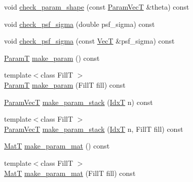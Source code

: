 \begin{DoxyCompactItemize}
\item 
void \hyperlink{classmappel_1_1PointEmitterModel_a54b341a9bc0e32e2c8bbfe4ec0d8c9a1}{check\+\_\+param\+\_\+shape} (const \hyperlink{classmappel_1_1PointEmitterModel_add253b568d763f1513a810aac35de719}{Param\+VecT} \&theta) const 
\item 
void \hyperlink{classmappel_1_1PointEmitterModel_a01ce8d6358acbd2575be519dff1df89b}{check\+\_\+psf\+\_\+sigma} (double psf\+\_\+sigma) const 
\item 
void \hyperlink{classmappel_1_1PointEmitterModel_a85780ca544a5ef5e0a62e74005081677}{check\+\_\+psf\+\_\+sigma} (const \hyperlink{namespacemappel_a2225ad69f358daa3f4f99282a35b9a3a}{VecT} \&psf\+\_\+sigma) const 
\item 
\hyperlink{classmappel_1_1PointEmitterModel_a665ec6aea3aac139bb69a23c06d4b9a1}{ParamT} \hyperlink{classmappel_1_1PointEmitterModel_a1cd8ff64ce4132b6eaa8655696885749}{make\+\_\+param} () const 
\item 
{\footnotesize template$<$class FillT $>$ }\\\hyperlink{classmappel_1_1PointEmitterModel_a665ec6aea3aac139bb69a23c06d4b9a1}{ParamT} \hyperlink{classmappel_1_1PointEmitterModel_a5638e3df26cf84d7cf0f23112132682e}{make\+\_\+param} (FillT fill) const 
\item 
\hyperlink{classmappel_1_1PointEmitterModel_add253b568d763f1513a810aac35de719}{Param\+VecT} \hyperlink{classmappel_1_1PointEmitterModel_a6c7edc7f2549058df66472cd7647cf9b}{make\+\_\+param\+\_\+stack} (\hyperlink{namespacemappel_ab17ec0f30b61ece292439d7ece81d3a8}{IdxT} n) const 
\item 
{\footnotesize template$<$class FillT $>$ }\\\hyperlink{classmappel_1_1PointEmitterModel_add253b568d763f1513a810aac35de719}{Param\+VecT} \hyperlink{classmappel_1_1PointEmitterModel_abab975b04e09e6336a930b6d8fd8c267}{make\+\_\+param\+\_\+stack} (\hyperlink{namespacemappel_ab17ec0f30b61ece292439d7ece81d3a8}{IdxT} n, FillT fill) const 
\item 
\hyperlink{namespacemappel_a7091ab87c528041f7e2027195fad8915}{MatT} \hyperlink{classmappel_1_1PointEmitterModel_a8ede9fe8e3b6a3e621c2da72e23c7f9d}{make\+\_\+param\+\_\+mat} () const 
\item 
{\footnotesize template$<$class FillT $>$ }\\\hyperlink{namespacemappel_a7091ab87c528041f7e2027195fad8915}{MatT} \hyperlink{classmappel_1_1PointEmitterModel_a68a9c537f2f2725eb8fb9d3e250dd84b}{make\+\_\+param\+\_\+mat} (FillT fill) const 
\item 

\end{DoxyCompactItemize}
